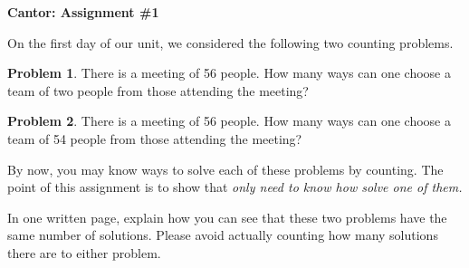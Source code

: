\documentclass[12pt,letterpaper]{article}
\theoremstyle{definition}
\newtheorem{problem}{Problem}
\begin{document}
\setlength{\parskip}{1ex plus 0.5ex minus 0.2ex}
\setlength{\parindent}{0pt}

\pagestyle{fancy}
\lfoot{}
\rfoot{}

\begin{center}
{
\Large
\textbf{Cantor: Assignment \#1}
}
\end{center}

On the first day of our unit, we considered the following two counting problems.

\begin{problem}
There is a meeting of 56 people. How many ways can one choose a team of two people from those attending the meeting?
\end{problem}

\begin{problem}
There is a meeting of 56 people. How many ways can one choose a team of 54 people from those attending the meeting?
\end{problem}

By now, you may know ways to solve each of these problems by counting. 
The point of this assignment is to show that \emph{only need to know how solve one of them.}

In one written page, explain how you can see that these two problems have the same number of solutions. 
Please avoid actually counting how many solutions there are to either problem.
\end{document}
